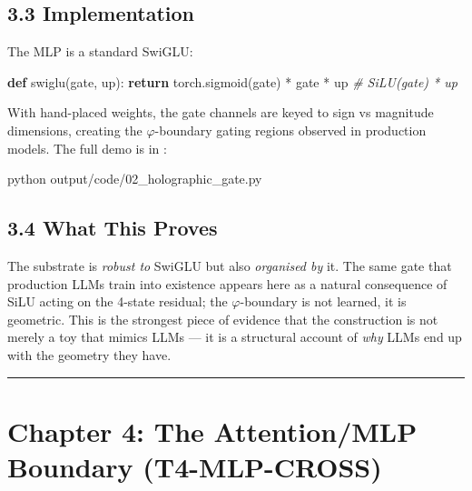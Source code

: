\documentclass[
  twocolumn,
  10pt,
  a4paper]{article}
\newenvironment{Shaded}{}{}
\newcommand{\CommentTok}[1]{\textcolor[rgb]{0.38,0.63,0.69}{\textit{#1}}}
\newcommand{\ControlFlowTok}[1]{\textcolor[rgb]{0.00,0.44,0.13}{\textbf{#1}}}
\newcommand{\ExtensionTok}[1]{#1}
\newcommand{\KeywordTok}[1]{\textcolor[rgb]{0.00,0.44,0.13}{\textbf{#1}}}
\newcommand{\NormalTok}[1]{#1}
\newcommand{\OperatorTok}[1]{\textcolor[rgb]{0.40,0.40,0.40}{#1}}
\begin{document}
\hypertarget{implementation-1}{%
\subsection{3.3 Implementation}\label{implementation-1}}

The MLP is a standard SwiGLU:

\begin{Shaded}
\begin{Highlighting}[]
\KeywordTok{def}\NormalTok{ swiglu(gate, up):}
    \ControlFlowTok{return}\NormalTok{ torch.sigmoid(gate) }\OperatorTok{*}\NormalTok{ gate }\OperatorTok{*}\NormalTok{ up   }\CommentTok{\# SiLU(gate) * up}
\end{Highlighting}
\end{Shaded}

With hand-placed weights, the gate channels are keyed to sign vs
magnitude dimensions, creating the \(\varphi\)-boundary gating regions
observed in production models. The full demo is in
\texttt{}:

\begin{Shaded}
\begin{Highlighting}[]
\ExtensionTok{python}\NormalTok{ output/code/02\_holographic\_gate.py}
\end{Highlighting}
\end{Shaded}

\hypertarget{what-this-proves-1}{%
\subsection{3.4 What This Proves}\label{what-this-proves-1}}

The substrate is \emph{robust to} SwiGLU but also \emph{organised by}
it. The same gate that production LLMs train into existence appears here
as a natural consequence of SiLU acting on the 4-state residual; the
\(\varphi\)-boundary is not learned, it is geometric. This is the
strongest piece of evidence that the construction is not merely a toy
that mimics LLMs --- it is a structural account of \emph{why} LLMs end
up with the geometry they have.

\begin{center}\rule{0.5\linewidth}{0.5pt}\end{center}

\hypertarget{chapter-4-the-attentionmlp-boundary-t4-mlp-cross}{%
\FloatBarrier
\section{Chapter 4: The Attention/MLP Boundary
(T4-MLP-CROSS)}\label{chapter-4-the-attentionmlp-boundary-t4-mlp-cross}}
\end{document}
